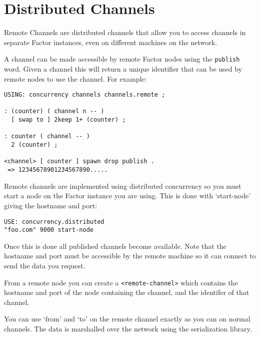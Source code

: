 \chapter{Distributed Channels}\label{dchannels}

Remote Channels are distributed channels that allow you to access
channels in separate Factor instances, even on different machines on
the network. 


A channel can be made accessible by remote Factor nodes using the
\texttt{publish} word. Given a channel this will return a unique
identifier that can be used by remote nodes to use the channel. For
example:

\begin{verbatim}
USING: concurrency channels channels.remote ;

: (counter) ( channel n -- )
  [ swap to ] 2keep 1+ (counter) ;
    
: counter ( channel -- )
  2 (counter) ;    

<channel> [ counter ] spawn drop publish .
 => 12345678901234567890.....
\end{verbatim}

Remote channels are implemented using
distributed concurrency so you must start a node on the Factor
instance you are using. This is done with `start-node' giving the
hostname and port:


\begin{verbatim}
USE: concurrency.distributed
"foo.com" 9000 start-node
\end{verbatim}

Once this is done all published channels become available. Note that
the hostname and port must be accessible by the remote machine so it
can connect to send the data you request.

From a remote node you can create a \texttt{<remote-channel>} which contains
the hostname and port of the node containing the channel, and the identifer
of that channel.

You can use `from' and `to' on the remote channel exactly as you can
on normal channels. The data is marshalled over the network using the
serialization library.  


